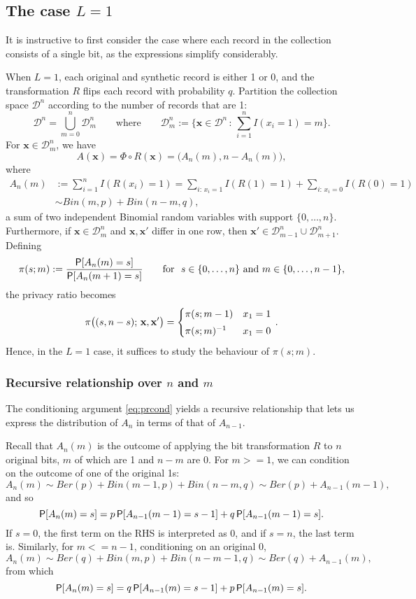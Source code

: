 \documentclass[11pt,draft]{article}
\newcommand{\Dsp}{\mathcal{D}}
\newcommand{\xv}{\mathbf{x}}
\begin{document}
\subsection{The case $L = 1$}

It is instructive to first consider the case where each record in the collection consists of a single bit, as the expressions simplify considerably.

When $L=1$, each original and synthetic record is either 1 or 0, and the transformation $R$ flips each record with probability $q$.
Partition the collection space $\Dsp^n$ according to the number of records that are 1:
\[ \Dsp^n = \bigcup_{m = 0}^n \Dsp_m^n
\quad\quad\text{where}\quad\quad
\Dsp_m^n := \bigg\{ \xv\in\Dsp^n \,:\, \sum_{i=1}^n I(x_i = 1) = m \bigg\}.
\]
For $\xv\in\Dsp_m^n$, we have
\[ A(\xv) = \Phi\circ R(\xv) = \big(A_n(m), n - A_n(m)\big), \]
where
\begin{align*}
A_n(m) &:= \sum_{i=1}^n I(R(x_i) = 1)
= \sum_{i:\, x_i = 1} I(R(1) = 1) + \sum_{i:\, x_i = 0} I(R(0) = 1) \\
&\sim Bin(m, p) + Bin(n-m, q),
\end{align*}
a sum of two independent Binomial random variables with support $\{0,\dots,n\}$.
Furthermore, if $\xv\in\Dsp_m^n$ and $\xv,\xv'$ differ in one row, then $\xv'\in\Dsp_{m-1}^n \cup \Dsp_{m+1}^n$.
Defining
\[ \pi(s; m) := \frac{\P[A_n(m) = s]}{\P[A_n(m+1) = s]}
\quad\quad\text{for}\ \ 
s\in\{0,\dots,n\}\ \text{and}\ m\in\{0,\dots,n-1\},
\]
the privacy ratio becomes
\[ \pi\big((s, n-s);\,\xv,\xv'\big) =
\begin{cases}
\pi(s;m - 1) & x_1 = 1 \\[0.3em]
\inv{\pi(s;m)} & x_1 = 0
\end{cases}\, .
\]
Hence, in the $L=1$ case, it suffices to study the behaviour of $\pi(s;m)$.


\subsubsection{Recursive relationship over $n$ and $m$}

The conditioning argument \eqref{eq:prcond} yields a recursive relationship that lets us express the distribution of $A_n$ in terms of that of $A_{n-1}$.

Recall that $A_n(m)$ is the outcome of applying the bit transformation $R$ to $n$ original bits, $m$ of which are 1 and $n-m$ are 0.
For $m >= 1$, we can condition on the outcome of one of the original 1s:
\[ A_n(m) \sim Ber(p) + Bin(m-1, p) + Bin(n-m, q) \sim Ber(p) + A_{n-1}(m-1), \]
and so
\begin{equation}\label{eq:rec1}
\P[A_n(m) = s] = p\P[A_{n-1}(m-1) = s-1] + q\P[A_{n-1}(m-1) = s].
\end{equation}
If $s = 0$, the first term on the RHS is interpreted as 0, and if $s = n$, the last term is.
Similarly, for $m <= n-1$, conditioning on an original 0,
\[ A_n(m) \sim Ber(q) + Bin(m, p) + Bin(n-m-1, q) \sim Ber(q) + A_{n-1}(m), \]
from which
\begin{equation}\label{eq:rec0}
\P[A_n(m) = s] = q\P[A_{n-1}(m) = s-1] + p\P[A_{n-1}(m) = s].
\end{equation}
\end{document}
